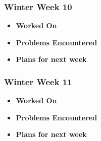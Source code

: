 \documentclass[compsoc,draftclsnofoot,onecolumn,10pt]{IEEEtran}
\begin{document}
\subsubsection{Winter Week 10}
\begin{itemize}
    \item {\textbf{Worked On}}
    \begin{itemize}

    \end{itemize}

    \item {\textbf{Problems Encountered}}
    \begin{itemize}

    \end{itemize}

    \item{\textbf{Plans for next week}}
    \begin{itemize}

    \end{itemize}

\end{itemize}

\subsubsection{Winter Week 11}
\begin{itemize}
    \item {\textbf{Worked On}}
    \begin{itemize}

    \end{itemize}

    \item {\textbf{Problems Encountered}}
    \begin{itemize}

    \end{itemize}

    \item{\textbf{Plans for next week}}
    \begin{itemize}

    \end{itemize}

\end{itemize}
\end{document}
